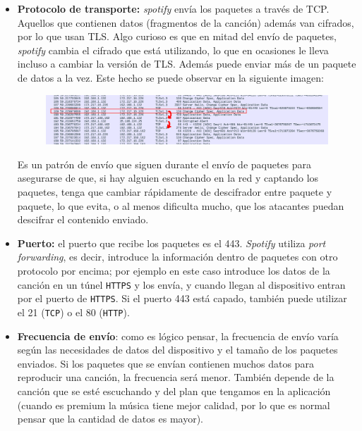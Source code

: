 \documentclass[11pt,a4paper]{article}
\begin{document}
\begin{itemize}
	\item \textbf{Protocolo de transporte:} \textit{spotify} envía los paquetes a través de TCP. Aquellos que contienen datos (fragmentos de la canción) además van cifrados, por lo que usan TLS. Algo curioso es que en mitad del envío de paquetes, \textit{spotify} cambia el cifrado que está utilizando, lo que en ocasiones le lleva incluso a cambiar la versión de TLS. Además puede enviar más de un paquete de datos a la vez. Este hecho se puede observar en la siguiente imagen:
	
	\begin{figure}[H]
		\centering
		\includegraphics[scale=0.35]{img/patron-change-cipher.png}
	\end{figure}
	
	Es un patrón de envío que siguen durante el envío de paquetes para asegurarse de que, si hay alguien escuchando en la red y captando los paquetes, tenga que cambiar rápidamente de descifrador entre paquete y paquete, lo que evita, o al menos dificulta mucho, que los atacantes puedan descifrar el contenido enviado.
	
	\item \textbf{Puerto:} el puerto que recibe los paquetes es el 443. \textit{Spotify} utiliza \textit{port forwarding}, es decir, introduce la información dentro de paquetes con otro protocolo por encima; por ejemplo en este caso introduce los datos de la canción en un túnel \texttt{HTTPS} y los envía, y cuando llegan al dispositivo entran por el puerto de \texttt{HTTPS}. Si el puerto 443 está capado, también puede utilizar el 21 (\texttt{TCP}) o el 80 (\texttt{HTTP}).
	
	\item \textbf{Frecuencia de envío}: como es lógico pensar, la frecuencia de envío varía según las necesidades de datos del dispositivo y el tamaño de los paquetes enviados. Si los paquetes que se envían contienen muchos datos para reproducir una canción, la frecuencia será menor. También depende de la canción que se esté escuchando y del plan que tengamos en la aplicación (cuando es premium la música tiene mejor calidad, por lo que es normal pensar que la cantidad de datos es mayor).
	

\end{itemize}
\end{document}
